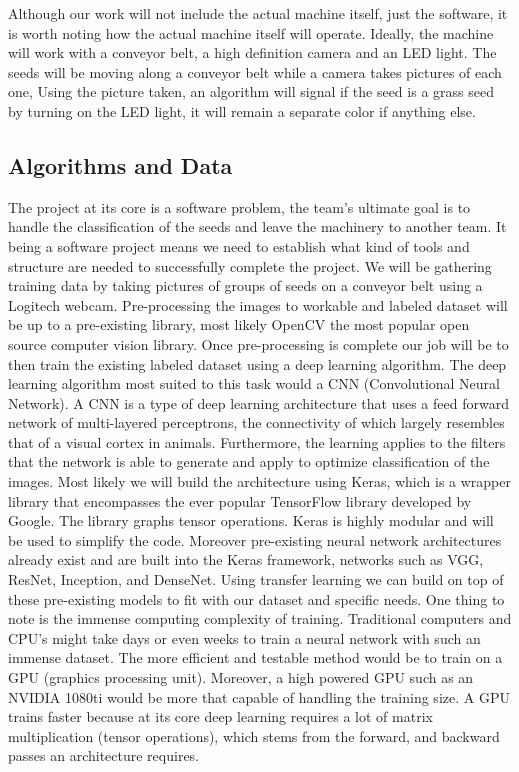 \documentclass[onecolumn, draftclsnofoot,10pt, compsoc]{IEEEtran}
\begin{document}
Although our work will not include the actual machine itself, just the software, it is worth noting how the actual machine itself will operate. Ideally, the machine will work with a conveyor belt, a high definition camera and an LED light. The seeds will be moving along a conveyor belt while a camera takes pictures of each one, Using the picture taken, an algorithm will signal if the seed is a grass seed by turning on the LED light, it will remain a separate color if anything else. 

\subsection{Algorithms and Data}

The project at its core is a software problem, the team's ultimate goal is to handle the classification of the seeds and leave the machinery to another team. It being a software project means we need to establish what kind of tools and structure are needed to successfully complete the project. We will be gathering training data by taking pictures of groups of seeds on a conveyor belt using a Logitech webcam. Pre-processing the images to workable and labeled dataset will be up to a pre-existing library, most likely OpenCV the most popular open source computer vision library. Once pre-processing is complete our job will be to then train the existing labeled dataset using a deep learning algorithm. The deep learning algorithm most suited to this task would a CNN (Convolutional Neural Network). A CNN is a type of deep learning architecture that uses a feed forward network of multi-layered perceptrons, the connectivity of which largely resembles that of a visual cortex in animals. Furthermore, the learning applies to the filters that the network is able to generate and apply to optimize classification of the images. Most likely we will build the architecture using Keras, which is a wrapper library that encompasses the ever popular TensorFlow library developed by Google. The library graphs tensor operations. Keras is highly modular and will be used to simplify the code. Moreover pre-existing neural network architectures already exist and are built into the Keras framework, networks such as VGG, ResNet, Inception, and DenseNet. Using transfer learning we can build on top of these pre-existing models to fit with our dataset and specific needs. One thing to note is the immense computing complexity of training. Traditional computers and CPU's might take days or even weeks to train a neural network with such an immense dataset. The more efficient and testable method would be to train on a GPU (graphics processing unit). Moreover, a high powered GPU such as an NVIDIA 1080ti would be more that capable of handling the training size. A GPU trains faster because at its core deep learning requires a lot of matrix multiplication (tensor operations), which stems from the forward, and backward passes an architecture requires.
\end{document}
